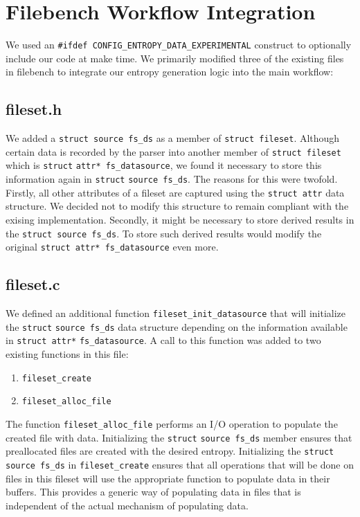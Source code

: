 \section{Filebench Workflow Integration}
We used an \verb+#ifdef CONFIG_ENTROPY_DATA_EXPERIMENTAL+ construct to optionally include our code at make time. We primarily modified three of the existing files in filebench to integrate our entropy generation logic into the main workflow:
\subsection{fileset.h}
We added a \verb+struct source fs_ds+ as a member of \verb+struct fileset+. Although certain data is recorded by the parser into another member of \verb+struct fileset+ which is \verb+struct+ \verb+attr* fs_datasource+, we found it necessary to store this information again in \verb+struct+ \verb+source fs_ds+. The reasons for this were twofold. Firstly, all other attributes of a fileset are captured using the \verb+struct attr+ data structure. We decided not to modify this structure to remain compliant with the exising implementation. Secondly, it might be necessary to store derived results in the \verb+struct source fs_ds+. To store such derived results would modify the original \verb+struct attr* fs_datasource+ even more.

\subsection{fileset.c}
We defined an additional function \verb+fileset_init_datasource+ that will initialize the \verb+struct+ \verb+source fs_ds+ data structure depending on the information available in \verb+struct attr*+ \verb+fs_datasource+. A call to this function was added to two existing functions in this file:
\begin{enumerate}
\item \verb+fileset_create+
\item \verb+fileset_alloc_file+
\end{enumerate}
The function \verb+fileset_alloc_file+ performs an I/O operation to populate the created file with data. Initializing the \verb+struct+ \verb+source fs_ds+ member ensures that preallocated files are created with the desired entropy. Initializing the \verb+struct source fs_ds+ in \newline\verb+fileset_create+ ensures that all operations that will be done on files in this fileset will use the appropriate function to populate data in their buffers. This provides a generic way of populating data in files that is independent of the actual mechanism of populating data.

